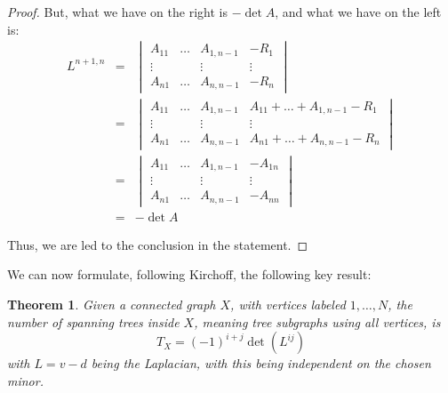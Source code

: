 \documentclass[12pt]{amsbook}
\newtheorem{theorem}{Theorem}[chapter]
\begin{document}
\begin{proof}
But, what we have on the right is $-\det A$, and what we have on the left is:
\begin{eqnarray*}
L^{n+1,n}
&=&\begin{vmatrix}
A_{11}&\ldots&A_{1,n-1}&-R_1\\
\vdots&&\vdots&\vdots\\
A_{n1}&\ldots&A_{n,n-1}&-R_n
\end{vmatrix}\\
&=&\begin{vmatrix}
A_{11}&\ldots&A_{1,n-1}&A_{11}+\ldots+A_{1,n-1}-R_1\\
\vdots&&\vdots&\vdots\\
A_{n1}&\ldots&A_{n,n-1}&A_{n1}+\ldots+A_{n,n-1}-R_n
\end{vmatrix}\\
&=&\begin{vmatrix}
A_{11}&\ldots&A_{1,n-1}&-A_{1n}\\
\vdots&&\vdots&\vdots\\
A_{n1}&\ldots&A_{n,n-1}&-A_{nn}
\end{vmatrix}\\
&=&-\det A
\end{eqnarray*}

Thus, we are led to the conclusion in the statement.
\end{proof}

We can now formulate, following Kirchoff, the following key result:


\begin{theorem}
Given a connected graph $X$, with vertices labeled $1,\ldots,N$, the number of spanning trees inside $X$, meaning tree subgraphs using all vertices, is
$$T_X=(-1)^{i+j}\det(L^{ij})$$
with $L=v-d$ being the Laplacian, with this being independent on the chosen minor.
\end{theorem}
\end{document}
